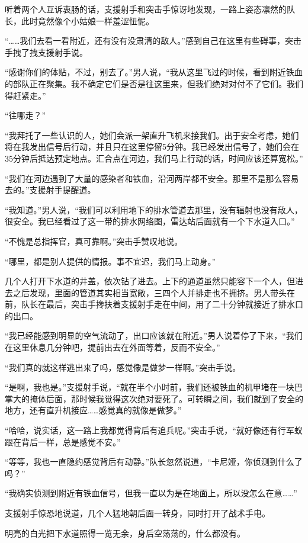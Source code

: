听着两个人互诉衷肠的话，支援射手和突击手惊讶地发现，一路上姿态凛然的队长，此时竟然像个小姑娘一样羞涩忸怩。

“……我们去看一看附近，还有没有没肃清的敌人。”感到自己在这里有些碍事，突击手拽了拽支援射手说。

“感谢你们的体贴，不过，别去了。”男人说，“我从这里飞过的时候，看到附近铁血的部队正在聚集。我不确定它们是否是往这里来，但我们绝对对付不了它们。我们得赶紧走。”

“往哪走？”

“我拜托了一些认识的人，她们会派一架直升飞机来接我们。出于安全考虑，她们将在我发出信号后行动，并且只在这里停留5分钟。我已经发出信号了，她们会在35分钟后抵达预定地点。汇合点在河边，我们马上行动的话，时间应该还算宽松。”

“我们在河边遇到了大量的感染者和铁血，沿河两岸都不安全。那里不是那么容易去的。”支援射手提醒道。

“我知道。”男人说，“我们可以利用地下的排水管道去那里，没有辐射也没有敌人，很安全。我已经看过了这一带的排水网络图，雷达站后面就有一个下水道入口。”

“不愧是总指挥官，真可靠啊。”突击手赞叹地说。

“哪里，都是别人提供的情报。事不宜迟，我们马上动身。”

几个人打开下水道的井盖，依次钻了进去。上下的通道虽然只能容下一个人，但进去之后发现，里面的管道其实相当宽敞，三四个人并排走也不拥挤。男人带头在前，队长在最后，突击手搀扶着支援射手走在中间，用了二十分钟就接近了排水口的出口。

“我已经能感到明显的空气流动了，出口应该就在附近。”男人说着停了下来，“我们在这里休息几分钟吧，提前出去在外面等着，反而不安全。”

“我们真的就这样逃出来了吗，感觉像是做梦一样啊。”突击手说。

“是啊，我也是。”支援射手说，“就在半个小时前，我们还被铁血的机甲堵在一块巴掌大的掩体后面，那时候我觉得这次绝对要死了。可转瞬之间，我们就到了安全的地方，还有直升机接应……感觉真的就像是做梦。”

“哈哈，说实话，这一路上我都觉得背后有追兵呢。”突击手说，“就好像还有行军蚁跟在背后一样，总是感觉不安。”

“等等，我也一直隐约感觉背后有动静。”队长忽然说道，“卡尼娅，你侦测到什么了吗？”

“我确实侦测到附近有铁血信号，但我一直以为是在地面上，所以没怎么在意……”

支援射手惊恐地说道，几个人猛地朝后面一转身，同时打开了战术手电。

明亮的白光把下水道照得一览无余，身后空荡荡的，什么都没有。


